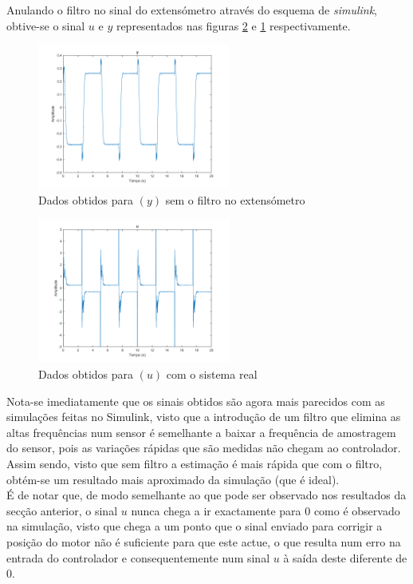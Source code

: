 \documentclass[%
  reprint,
  nofootinbib,
  amsmath,amssymb,
  aps,
  10pt,
  a4paper
]{revtex4-1}
\begin{document}
Anulando o filtro no sinal do extensómetro através do esquema de {\it simulink}, obtive-se o sinal $u$ e $y$ representados nas figuras \ref{fig:u_00} e \ref{fig:y_00} respectivamente.\\
\begin{figure}[t]
\includegraphics[width=2.5in]{../imgs/dados_00/dados_00_y.png}
\caption{Dados obtidos para $(y)$ sem o filtro no extensómetro}
\label{fig:y_00}
\end{figure}
\begin{figure}[t]
\includegraphics[width=2.5in]{../imgs/dados_00/dados_00_u.png}
\caption{Dados obtidos para $(u)$ com o sistema real}
\label{fig:u_00}
\end{figure}

Nota-se imediatamente que os sinais obtidos são agora mais parecidos com as simulações feitas no Simulink, visto que a introdução de um filtro que elimina as altas frequências num sensor é semelhante a baixar a frequência de amostragem do sensor, pois as variações rápidas que são medidas não chegam ao controlador. Assim sendo, visto que sem filtro a estimação é mais rápida que com o filtro, obtém-se um resultado mais aproximado da simulação (que é ideal).\\
É de notar que, de modo semelhante ao que pode ser observado nos resultados da secção anterior, o sinal $u$ nunca chega a ir exactamente para 0 como é observado na simulação, visto que chega a um ponto que o sinal enviado para corrigir a posição do motor não é suficiente para que este actue, o que resulta num erro na entrada do controlador e consequentemente num sinal $u$ à saída deste diferente de 0.
\end{document}
